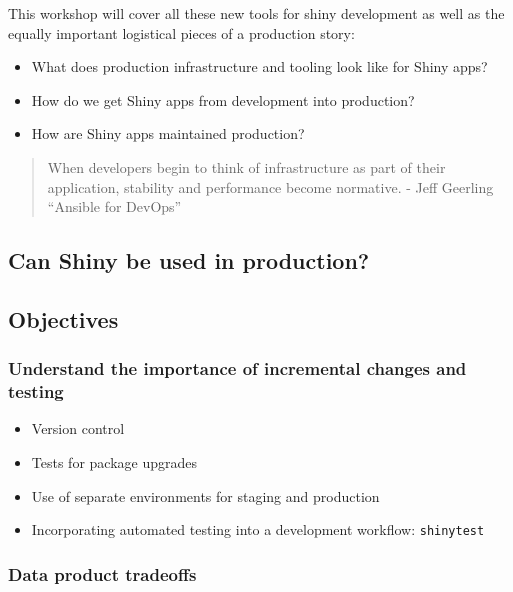 \documentclass[]{book}
\providecommand{\tightlist}{%
  \setlength{\itemsep}{0pt}\setlength{\parskip}{0pt}}
\begin{document}
This workshop will cover all these new tools for shiny development as
well as the equally important logistical pieces of a production story:

\begin{itemize}
\tightlist
\item
  What does production infrastructure and tooling look like for Shiny
  apps?
\item
  How do we get Shiny apps from development into production?
\item
  How are Shiny apps maintained production?
\end{itemize}

\begin{quote}
When developers begin to think of infrastructure as part of their
application, stability and performance become normative. - Jeff Geerling
``Ansible for DevOps''
\end{quote}

\hypertarget{can-shiny-be-used-in-production}{%
\subsection{Can Shiny be used in
production?}\label{can-shiny-be-used-in-production}}

\hypertarget{objectives}{%
\subsection{Objectives}\label{objectives}}

\hypertarget{understand-the-importance-of-incremental-changes-and-testing}{%
\subsubsection{Understand the importance of incremental changes and
testing}\label{understand-the-importance-of-incremental-changes-and-testing}}

\begin{itemize}
\tightlist
\item
  Version control
\item
  Tests for package upgrades
\item
  Use of separate environments for staging and production
\item
  Incorporating automated testing into a development workflow:
  \texttt{shinytest}
\end{itemize}

\hypertarget{data-product-tradeoffs}{%
\subsubsection{Data product tradeoffs}\label{data-product-tradeoffs}}
\end{document}
